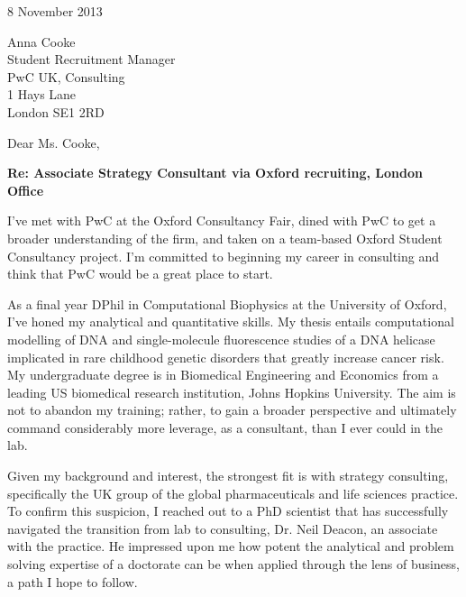 \documentclass[a4paper]{../res}
\begin{document}
 
\begin{sloppypar}
 
%


\begin{resume} 

8 November 2013

Anna Cooke \\
Student Recruitment Manager \\
PwC UK, Consulting \\
1 Hays Lane \\
London SE1 2RD

Dear Ms. Cooke,

\textbf{Re: Associate Strategy Consultant via Oxford recruiting, London Office}

I've met with PwC at the Oxford Consultancy Fair, dined with PwC to get a broader understanding of the firm, and taken on a team-based Oxford Student Consultancy project. I'm committed to beginning my career in consulting and think that PwC would be a great place to start. 

As a final year DPhil in Computational Biophysics at the University of Oxford, I've honed my analytical and quantitative skills. My thesis entails computational modelling of DNA and single-molecule fluorescence studies of a DNA helicase implicated in rare childhood genetic disorders that greatly increase cancer risk. My undergraduate degree is in Biomedical Engineering and Economics from a leading US biomedical research institution, Johns Hopkins University. The aim is not to abandon my training; rather, to gain a broader perspective and ultimately command considerably more leverage, as a consultant, than I ever could in the lab.

Given my background and interest, the strongest fit is with strategy consulting, specifically the UK group of the global pharmaceuticals and life sciences practice. To confirm this suspicion, I reached out to a PhD scientist that has successfully navigated the transition from lab to consulting, Dr. Neil Deacon, an associate with the practice. He impressed upon me how potent the analytical and problem solving expertise of a doctorate can be when applied through the lens of business, a path I hope to follow. 



\end{resume}
\end{sloppypar}
\end{document}
